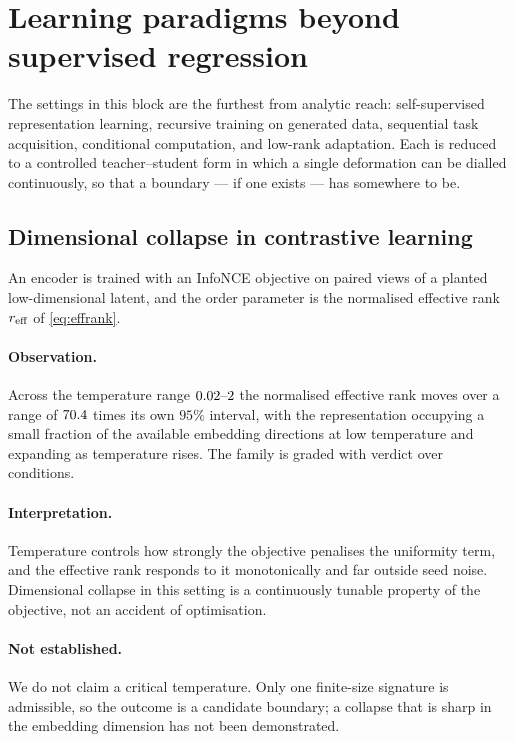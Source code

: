 \section{Learning paradigms beyond supervised regression}
\label{sec:paradigm}

The settings in this block are the furthest from analytic reach: self-supervised
representation learning, recursive training on generated data, sequential task
acquisition, conditional computation, and low-rank adaptation. Each is reduced
to a controlled teacher--student form in which a single deformation can be
dialled continuously, so that a boundary --- if one exists --- has somewhere to
be.

\subsection{Dimensional collapse in contrastive learning}

An encoder is trained with an InfoNCE objective on paired views of a planted
low-dimensional latent, and the order parameter is the normalised effective
rank $r_{\rm eff}$ of \eqref{eq:effrank}.

\paragraph{Observation.} Across the temperature range
$0.02\text{--}2{}$ the normalised effective rank moves
over a range of $70.4{}$ times its own
$95\%$ interval, with the representation occupying a small fraction of the
available embedding directions at low temperature and expanding as temperature
rises. The family is graded
\AtlasContrastiveCollapseGrade{} with verdict
\emph{\AtlasContrastiveCollapseVerdict{}} over
\AtlasContrastiveCollapseConditions{} conditions.

\paragraph{Interpretation.} Temperature controls how strongly the objective
penalises the uniformity term, and the effective rank responds to it
monotonically and far outside seed noise. Dimensional collapse in this setting
is a continuously tunable property of the objective, not an accident of
optimisation.

\paragraph{Not established.} We do not claim a critical temperature. Only one
finite-size signature is admissible, so the outcome is a candidate boundary; a
collapse that is sharp in the embedding dimension has not been demonstrated.

